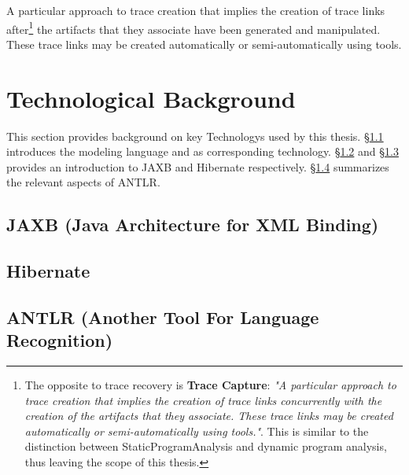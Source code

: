 \begin{definition}
A particular approach to trace creation that implies the creation of trace links after\footnote{The opposite to trace recovery is \textbf{Trace Capture}: \textit{"A particular approach to trace creation that implies the creation of trace links concurrently with the creation of the artifacts that they associate. These trace links may be created automatically or semi-automatically using tools."}\cite{DBLP:books/daglib/p/GotelCHZEGDAMM12}. This is similar to the distinction between \gls{StaticProgramAnalysis} and dynamic program analysis, thus leaving the scope of this thesis.} the artifacts that they associate have been generated and manipulated.
These trace links may be created automatically or semi-automatically using tools. 
\cite{DBLP:books/daglib/p/GotelCHZEGDAMM12}
\end{definition}


\section{Technological Background}
This section provides background on key \glspl{Technology} used by this thesis.
§\ref{subsection:MegaLXText} introduces the \megal modeling language and \megalxtext as corresponding technology.
§\ref{subsection:JAXB} and §\ref{subsection:Hibernate} provides an introduction to \gls{JAXB} and \gls{Hibernate} respectively.
§\ref{subsection:ANTLR} summarizes the relevant aspects of \gls{ANTLR}.

\subsection{\megalxtext}
\label{subsection:MegaLXText}
\cite{DBLP:conf/sattose/BaggeZ14}
\cite{DBLP:journals/entcs/FavreN05}

\cite{DBLP:conf/ecmdafa/LammelV14}
\cite{DBLP:conf/models/FavreLV12}
\cite{DBLP:conf/sle/Lammel16}

\cite{LukasHaertelBScThesis}

\subsection{JAXB (Java Architecture for XML Binding)}
\label{subsection:JAXB}

\subsection{Hibernate}
\label{subsection:Hibernate}

\subsection{ANTLR (Another Tool For Language Recognition)}
\label{subsection:ANTLR}
\cite{Parr:2013:DAR:2501720}

